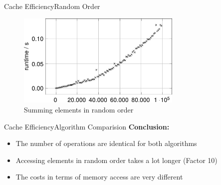 %
%  
%
%
%  


\begin{frame}{Cache Efficiency}{Random Order}
  \begin{figure}
    \begin{center}
      \includegraphics[width=0.7\textwidth]{Images/Caching/sumrandom-plot.pdf}
    \end{center}
    \caption{Summing elements in random order}
    \label{fig:caching:sum_random_order}
  \end{figure}
\end{frame}


\begin{frame}{Cache Efficiency}{Algorithm Comparision}
  \textbf{Conclusion:}
  \begin{itemize}
    \item<2->
      The number of operations are identical for both algorithms
    \item<3->
      Accessing elements in random order takes a lot longer (Factor 10)
    \item<3->
      The costs in terms of memory access are very different
  \end{itemize}
\end{frame}

